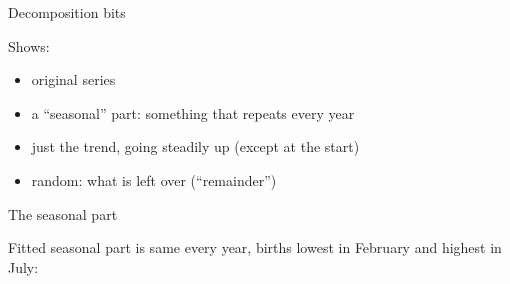 \documentclass[ignorenonframetext,]{beamer}
\newenvironment{Shaded}{\begin{snugshade}}{\end{snugshade}}
\newcommand{\NormalTok}[1]{#1}
\newcommand{\OperatorTok}[1]{\textcolor[rgb]{0.81,0.36,0.00}{\textbf{#1}}}
\providecommand{\tightlist}{%
  \setlength{\itemsep}{0pt}\setlength{\parskip}{0pt}}
\begin{document}
\begin{frame}{Decomposition bits}
\protect\hypertarget{decomposition-bits}{}

Shows:

\begin{itemize}
\tightlist
\item
  original series
\item
  a ``seasonal'' part: something that repeats every year
\item
  just the trend, going steadily up (except at the start)
\item
  random: what is left over (``remainder'')
\end{itemize}

\end{frame}

\begin{frame}[fragile]{The seasonal part}
\protect\hypertarget{the-seasonal-part}{}

Fitted seasonal part is same every year, births lowest in February and
highest in July:

\tiny

\begin{Shaded}
\end{Shaded}


\end{frame}
\end{document}
